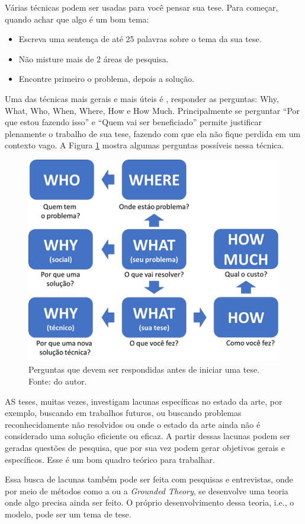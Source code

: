 Várias técnicas podem ser usadas para você pensar sua tese.
Para começar, quando achar que algo é um bom tema:
\begin{itemize}
    \item Escreva uma sentença de até 25 palavras sobre o tema da sua tese.
    \item Não misture mais de 2 áreas de pesquisa.
    \item Encontre primeiro o problema, depois a solução.
\end{itemize}

 Uma das técnicas mais gerais e mais úteis é , responder as perguntas: Why, What, Who, When, Where, How e How Much. 
Principalmente se perguntar “Por que estou fazendo isso” e “Quem vai ser beneficiado” permite justificar plenamente o trabalho de sua tese, fazendo com que ela não fique perdida em um contexto vago. 
A Figura \ref{fig:5w2h} mostra algumas perguntas possíveis nessa técnica.

\begin{figure}[hbt]
    \centering
    \includegraphics[width=0.7\linewidth]{Images/5w2h}
    \caption{Perguntas que devem ser respondidas antes de iniciar uma tese. Fonte: do autor.}
    \label{fig:5w2h}
\end{figure}

AS teses, muitas vezes, investigam lacunas específicas no estado da arte, por exemplo, buscando em trabalhos futuros, ou buscando problemas reconhecidamente não resolvidos ou onde o estado da arte ainda não é considerado uma solução eficiente ou eficaz. 
A partir dessas lacunas podem ser geradas questões de pesquisa, que por sua vez podem gerar objetivos gerais e específicos. Esse é um bom quadro teórico para trabalhar.

Essa busca de lacunas também pode ser feita com pesquisas e entrevistas, onde por meio de métodos como a \citep{bardin2011analise} ou a \textit{Grounded Theory}\citep{glaser1967discovery}, se desenvolve uma teoria onde algo precisa ainda ser feito. O próprio desenvolvimento dessa teoria, i.e., o modelo, pode ser um tema de tese.

